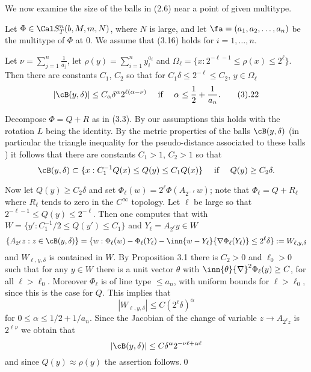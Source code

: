 We now examine the size of the balls in (2.6) near a point of given multitype.


  Let $\Phi\in \Cal S_T^n(b,M,m,N)$, where $N$ is large, and let
$\fa=(a_1,a_2,\dots, a_n)$ be the multitype of $\Phi$ at $0$.
We assume that (3.16) holds for $i=1,\dots,n$.

Let $\nu=\sum_{j=1}^n \frac 1{a_j}$,
 let $\rho(y)=\sum_{i=1}^n y_i^{a_i}$
and
$\Omega_\ell=\{x:2^{-\ell-1}\le \rho(x)\le 2^\ell\}.$
Then there are constants $C_1$, $C_2$ so that
for $C_1\delta\le 2^{-\ell}\le C_2$, $y\in \Omega_\ell$
$$
|\cB(y,\delta)|\le C_\alpha \delta^{\alpha} 2^{\ell(\alpha-\nu)}
\quad \text{ if }  \quad \alpha\le \frac 12+\frac 1{a_n}.
\tag 3.22
$$

\endproclaim

 Decompose $\Phi=Q+R$ as in (3.3). By our assumptions this 
holds with the rotation $L$ being the identity.
By the metric properties of the balls $\cB(y,\delta)$ (in particular the 
triangle inequality for the pseudo-distance 
associated to these balls \cite{2}) 
it follows that there are constants $C_1>1$, $C_2>1$
so that
$$
\cB(y,\delta)\subset \{ x: C_1^{-1} Q(x)\le Q(y)\le  C_1 Q(x)\}\quad
\text{ if }\quad Q(y)\ge C_2\delta .
 $$

Now let $Q(y)\ge C_2\delta$ and
set $\Phi_\ell(w)=2^\ell\Phi(A_{2^{-\ell}} w)$; note that
$\Phi_\ell=Q+R_\ell$ where $R_\ell$ tends to zero in the $C^\infty$ topology.
Let $\ell $ be large so that $2^{-\ell-1}\le Q(y)\le 2^{-\ell}$.
Then one computes  that with 
$W=\{y':C_1^{-1}/2\le Q(y')\le  C_1\}$ and  
$Y_\ell=A_{2^\ell}y\in W$ 
$$
\{A_{2^{\ell}}z: z\in \cB(y,\delta)\}
=
\{w:\Phi_\ell(w)-\Phi_\ell (Y_\ell)-\inn{w-Y_\ell}{\nabla\Phi_\ell(Y_\ell)}
\le 2^\ell\delta\}
:=W_{\ell,y,\delta}
$$
and  $W_{\ell,y,\delta}$ is contained in 
$W$. 
By Proposition 3.1  there is $C_2>0$ 
and $\ell_0>0$
such that  for any $y\in W$ there is a unit vector $\theta$ with
${\inn {\theta}{\nabla}}^2\Phi_\ell(y)\ge C$, for all $\ell>\ell_0$.
Moreover 
$\Phi_\ell$ is of line type $\le a_n$, with uniform bounds for $\ell>\ell_0$,
 since this is the case for $Q$.
This implies that
$$|W_{\ell,y,\delta}|\le C (2^\ell\delta)^{\alpha}$$
for $0\le \alpha\le 1/2+1/a_n$.
Since the Jacobian of the change of variable $z\to A_{2^\ell z}$ is
$2^{\ell\nu}$
we obtain that 
$$
|\cB(y, \delta)|\le C\delta^{\alpha} 2^{-\nu\ell+\alpha\ell}
$$
 and since 
$Q(y)\approx \rho(y)$ the assertion follows.\qed
\enddemo

